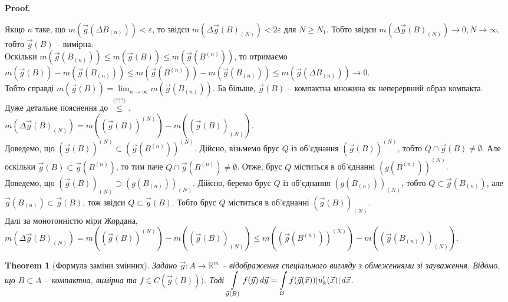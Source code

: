 \documentclass[a4paper, 10pt]{article}
\makeatletter
\def\qed{$\blacksquare$}
\theoremstyle{theoremdd}
\newtheorem{theorem}{Theorem}[subsection]
\theoremstyle{theoremdd}
\theoremstyle{theoremdd}
\theoremstyle{theoremdd}
\theoremstyle{theoremdd}
\theoremstyle{theoremdd}
\theoremstyle{theoremdd}
\theoremstyle{theoremdd}
\theoremstyle{theoremdd}
\theoremstyle{theoremdd}
\theoremstyle{theoremdd}
\theoremstyle{theoremdd}
\theoremstyle{theoremdd}
\theoremstyle{theoremdd}
\theoremstyle{theoremdd}
\renewenvironment{proof}[1][Proof.\\]{\par
\pushQED{\hfill \qed}%
\normalfont \topsep6\p@\@plus6\p@\relax
\trivlist
\item\relax
{\bfseries
#1\@addpunct{.}}\hspace\labelsep\ignorespaces
}{%
\popQED\endtrivlist\@endpefalse
}
\makeatother
\begin{document}
\begin{proof}
Якщо $n$ таке, що $m(\vec{g}(\Delta B_{(n)})) < \varepsilon$, то звідси $m(\Delta \vec{g}(B)_{(N)}) < 2\varepsilon$ для $N \geq N_1$. Тобто звідси $m(\Delta \vec{g}(B)_{(N)}) \to 0, N \to \infty$, тобто $\vec{g}(B)$ -- вимірна.\\
Оскільки $m(\vec{g}(B_{(n)})) \leq m(\vec{g}(B)) \leq m(\vec{g}(B^{(n)}))$, то отримаємо\\
$m(\vec{g}(B)) - m(\vec{g}(B_{(n)})) \leq m(\vec{g}(B^{(n)})) - m(\vec{g}(B_{(n)})) \leq m(\vec{g}(\Delta B_{(n)})) \to 0$.\\
Тобто справді $m(\vec{g}(B)) = \displaystyle\lim_{n \to \infty} m(\vec{g}(B_{(n)}))$. Ба більше, $\vec{g}(B)$ -- компактна множина як неперервний образ компакта.
\bigskip \\
Дуже детальне пояснення до $\overset{\text{(???)}}{\leq}$.\\
$m(\Delta \vec{g}(B)_{(N)}) = m((\vec{g}(B))^{(N)}) - m((\vec{g}(B))_{(N)})$.\\
Доведемо, що $(\vec{g}(B))^{(N)} \subset (\vec{g}(B^{(n)}))^{(N)}$. Дійсно, візьмемо брус $Q$ із об'єднання $(\vec{g}(B))^{(N)}$, тобто $Q \cap \vec{g}(B) \neq \emptyset$. Але оскільки $\vec{g}(B) \subset \vec{g}(B^{(n)})$, то тим паче $Q \cap \vec{g}(B^{(n)}) \neq \emptyset$. Отже, брус $Q$ міститься в об'єднанні $(g(B^{(n)}))^{(N)}$.\\
Доведемо, що $(\vec{g}(B))_{(N)} \supset (g(B_{(n)}))_{(N)}$. Дійсно, беремо брус $Q$ із об'єднання $(g(B_{(n)}))_{(N)}$, тобто $Q \subset \vec{g}(B_{(n)})$, але $\vec{g}(B_{(n)}) \subset \vec{g}(B)$, тож звідси $Q \subset \vec{g}(B)$. Тобто брус $Q$ міститься в об'єднанні $(\vec{g}(B))_{(N)}$.\\
Далі за монотонністю міри Жордана, $m(\Delta \vec{g}(B)_{(N)}) = m((\vec{g}(B))^{(N)}) - m((\vec{g}(B))_{(N)}) \leq m(( \vec{g}(B^{(n)}) )^{(N)}) - m(( \vec{g}(B_{(n)}) )_{(N)})$.
\end{proof}

\begin{theorem}[Формула заміни змінних]
Задано $\vec{g} \colon A \to \mathbb{R}^m$ -- відображення спеціального вигляду з обмеженнями зі зауваження. Відомо, що $B \subset A$ -- компактна, вимірна та $f \in C(\vec{g}(B)))$. Тоді $\displaystyle\int\displaylimits_{\vec{g}(B)} f(\vec{y})\,d\vec{y} = \int\displaylimits_B f(\vec{g}(\vec{x})) |u_k'(\vec{x})|\,d\vec{x}$.
\end{theorem}
\end{document}
